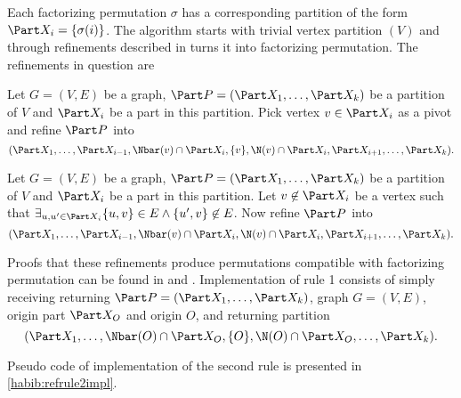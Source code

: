 Each factorizing permutation $\sigma$ has a corresponding partition of the form $\Part X_i = \{\sigma(i)\}$. The algorithm starts with trivial vertex partition $(V)$ and through refinements described in \cite{habib2} turns it into factorizing permutation. The refinements in question are

\begin{defi}\label{habib:refrule1}
    Let $G=(V,E)$ be a graph, $\Part P = (\Part X_1, \ldots, \Part X_k)$ be a partition of $V$ and $\Part X_i$ be a part in this partition. Pick vertex $v \in \Part X_i$ as a pivot and refine $\Part P$ into
    \[
        (\Part X_1, \ldots, \Part X_{i-1}, \Nbar(v) \cap \Part X_i, \{v\}, \N(v) \cap \Part X_i, \Part X_{i+1}, \ldots, \Part X_k).
    \]
\end{defi}

\begin{defi}\label{habib:refrule2}
    Let $G=(V,E)$ be a graph, $\Part P = (\Part X_1, \ldots, \Part X_k)$ be a partition of $V$ and $\Part X_i$ be a part in this partition. Let $v \not\in \Part X_i$ be a vertex such that $\exists_{u,u' \in \Part X_i} \{u,v\} \in E \land \{u',v\} \not\in E$. Now refine $\Part P$ into
    \[
        (\Part X_1, \ldots, \Part X_{i-1}, \Nbar(v) \cap \Part X_i, \N(v) \cap \Part X_i, \Part X_{i+1}, \ldots, \Part X_k).
    \]
\end{defi}

Proofs that these refinements produce permutations compatible with factorizing permutation can be found in \cite{habib} and \cite{habib2}. Implementation of rule 1 consists of simply receiving returning $\Part P = (\Part X_1, \ldots, \Part X_k)$, graph $G=(V,E)$, origin part $\Part X_O$ and origin $O$, and returning partition
\[
    (\Part X_1, \ldots, \Nbar(O) \cap \Part X_O, \{O\}, \N(O) \cap \Part X_O, \ldots, \Part X_k).
\]
% 

% 
Pseudo code of implementation of the second rule is presented in \ref{habib:refrule2impl}.

